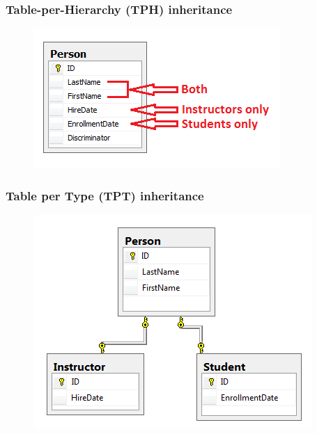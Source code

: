 \documentclass{beamer}
\begin{document}
\begin{frame}
	\frametitle{Table-per-Hierarchy (TPH) inheritance}
	\begin{figure}
		\centering
		\includegraphics[scale=0.8]{resources/entity-framework/tph.png}
	\end{figure}
\end{frame}

\begin{frame}
	\frametitle{Table per Type (TPT) inheritance}
	\begin{figure}
		\centering
		\includegraphics[scale=0.5]{resources/entity-framework/tpt.png}
	\end{figure}
\end{frame}
\end{document}
